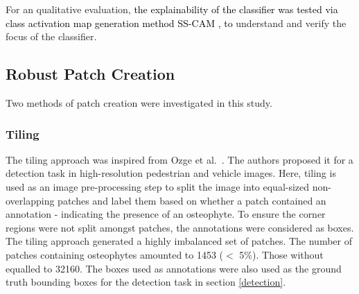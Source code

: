 \documentclass{article}
\newcommand{\final}[1]{\textcolor{black}{#1}}
\begin{document}
For an qualitative evaluation, \final{the explainability of the classifier was tested via class activation map generation method SS-CAM \cite{wang2020ss}, to} understand and verify the focus of the classifier.


\subsection{Robust Patch Creation}
\label{sec:patch_creation}
Two methods of patch creation were investigated in this study.
\subsubsection{Tiling}
The tiling approach was inspired from Ozge et al.~\cite{ozge2019power}. The authors proposed it for a detection task in high-resolution pedestrian and vehicle images. Here, tiling is used as an image pre-processing step to split the image into equal-sized non-overlapping patches and label them based on whether a patch contained an annotation - indicating the presence of an osteophyte. 
To ensure the corner regions were not split amongst patches, the annotations were considered as boxes.
The tiling approach generated a highly imbalanced set of patches. The number of patches containing osteophytes amounted to 1453 ($<$ 5\%). Those without equalled to 32160. The boxes used as annotations were also used as the ground truth bounding boxes for the detection task in section \ref{detection}.
\end{document}
